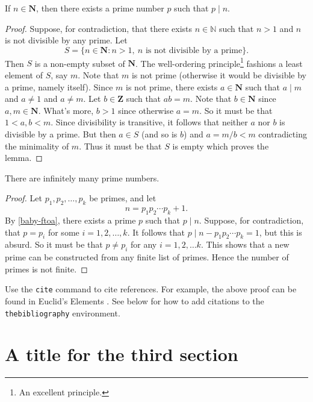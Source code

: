 \documentclass{rhumj_new}
\begin{document}
\begin{lemma} \label{baby-ftoa}
If $n \in \mathbf{N}$, then there exists a prime number $p$ such that $p \mid n$.
\end{lemma}

\begin{proof}
Suppose, for contradiction, that there exists $n \in \mathbb{N}$ such that $n >1$ and $n$ is not divisible by any prime. Let
\[ S = \{ n \in \mathbf{N}: n>1,\ \text{$n$ is not divisible by a prime}\}.\]
Then $S$ is a non-empty subset of $\mathbf{N}$. The well-ordering principle\footnote{An excellent principle.} fashions a least element of $S$, say $m$. Note that $m$ is not prime (otherwise it would be divisible by a prime, namely itself). Since $m$ is not prime, there exists $a \in \mathbf{N}$ such that $a \mid m$ and $a \neq 1$ and $a \neq m$. Let $b \in \mathbf{Z}$ such that $ab = m$. Note that $b \in \mathbf{N}$ since $a,m \in \mathbf{N}$. What's more, $b >1$ since otherwise $a=m$. So it must be that $1 < a,b < m$. Since divisibility is transitive, it follows that neither $a$ nor $b$ is divisible by a prime. But then $a \in S$ (and so is $b$) and $a  = m/b < m$ contradicting the minimality of $m$. Thus it must be that $S$ is empty which proves the lemma.
\end{proof}

\begin{thm}[Euclid] There are infinitely many prime numbers.
\end{thm} \label{inf-prim}

\begin{proof}
Let $p_1,p_2,\ldots, p_k$ be primes, and let 
\[ n = p_1p_2 \cdots p_k + 1.\]
By \cref{baby-ftoa}, there exists a prime $p$ such that $p \mid n$. Suppose, for contradiction, that $p = p_i$ for some $i=1,2,\ldots, k$. It follows that $p \mid n-p_1p_2\cdots p_k = 1$, but this is absurd. So it must be that $p \neq p_i$ for any $i = 1,2,\ldots k$. This shows that a new prime can be constructed from any finite list of primes. Hence the number of primes is not finite. 
\end{proof}

Use the \texttt{cite} command to cite references. For example, the above proof can be found in Euclid's Elements \cite{elements}. See below for how to add citations to the \texttt{thebibliography} environment.

\section{A title for the third section}
\end{document}
